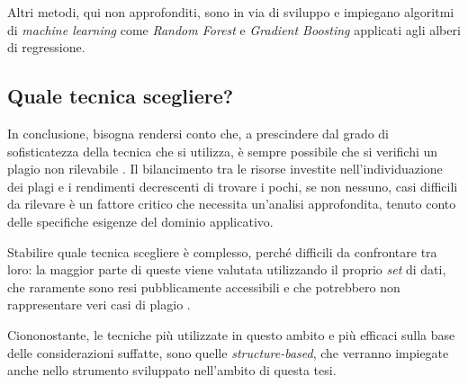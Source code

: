 Altri metodi, qui non approfonditi, sono in via di sviluppo e impiegano algoritmi di \textit{machine learning} come \textit{Random Forest} e \textit{Gradient Boosting} applicati agli alberi di regressione.

\subsection{Quale tecnica scegliere?}
In conclusione, bisogna rendersi conto che, a prescindere dal grado di sofisticatezza della tecnica che si utilizza, è sempre possibile che si verifichi un plagio non rilevabile \cite{joy-99}.
%
Il bilancimento tra le risorse investite nell'individuazione dei plagi e i rendimenti decrescenti di trovare i pochi, se non nessuno, casi difficili da rilevare è un fattore critico che necessita un'analisi approfondita, tenuto conto delle specifiche esigenze del dominio applicativo.

Stabilire quale tecnica scegliere è complesso, perché difficili da confrontare tra loro: la maggior parte di queste viene valutata utilizzando il proprio \textit{set} di dati, che raramente sono resi pubblicamente accessibili e che potrebbero non rappresentare veri casi di plagio \cite{karnalim-budi-toba-joy-2019}.

Ciononostante, le tecniche più utilizzate in questo ambito e più efficaci sulla base delle considerazioni suffatte, sono quelle \textit{structure-based}, che verranno impiegate anche nello strumento sviluppato nell'ambito di questa tesi. 
